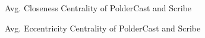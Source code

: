 
\begin{figure}[H]
    \centering
    
    \caption{Avg. Closeness Centrality of PolderCast and Scribe}
    \label{fig:eval_closeness}
\end{figure}

\begin{figure}[H]
    \centering
    
    \caption{Avg. Eccentricity Centrality of PolderCast and Scribe}
    \label{fig:eval_eccentricity}
\end{figure}

